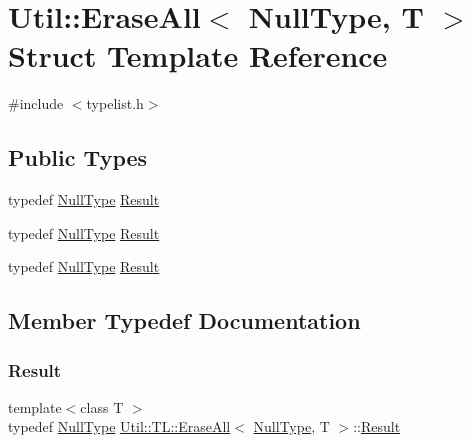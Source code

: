 \hypertarget{structUtil_1_1TL_1_1EraseAll_3_01NullType_00_01T_01_4}{}\section{Util\+:\+:Erase\+All$<$ Null\+Type, T $>$ Struct Template Reference}
\label{structUtil_1_1TL_1_1EraseAll_3_01NullType_00_01T_01_4}


{\ttfamily \#include $<$typelist.\+h$>$}

\subsection*{Public Types}
\begin{DoxyCompactItemize}
\item 
typedef \mbox{\hyperlink{classUtil_1_1NullType}{Null\+Type}} \mbox{\hyperlink{structUtil_1_1TL_1_1EraseAll_3_01NullType_00_01T_01_4_ae8985ba005cb92b28012106353aa56be}{Result}}
\item 
typedef \mbox{\hyperlink{classUtil_1_1NullType}{Null\+Type}} \mbox{\hyperlink{structUtil_1_1TL_1_1EraseAll_3_01NullType_00_01T_01_4_ae8985ba005cb92b28012106353aa56be}{Result}}
\item 
typedef \mbox{\hyperlink{classUtil_1_1NullType}{Null\+Type}} \mbox{\hyperlink{structUtil_1_1TL_1_1EraseAll_3_01NullType_00_01T_01_4_ae8985ba005cb92b28012106353aa56be}{Result}}
\end{DoxyCompactItemize}


\subsection{Member Typedef Documentation}
\mbox{\label{structUtil_1_1TL_1_1EraseAll_3_01NullType_00_01T_01_4_ae8985ba005cb92b28012106353aa56be}} 
\subsubsection{\texorpdfstring{Result}{Result}\hspace{0.1cm}{\footnotesize\ttfamily [1/3]}}
{\footnotesize\ttfamily template$<$class T $>$ \\
typedef \mbox{\hyperlink{classUtil_1_1NullType}{Null\+Type}} \mbox{\hyperlink{structUtil_1_1TL_1_1EraseAll}{Util\+::\+T\+L\+::\+Erase\+All}}$<$ \mbox{\hyperlink{classUtil_1_1NullType}{Null\+Type}}, T $>$\+::\mbox{\hyperlink{structUtil_1_1TL_1_1EraseAll_3_01NullType_00_01T_01_4_ae8985ba005cb92b28012106353aa56be}{Result}}}

